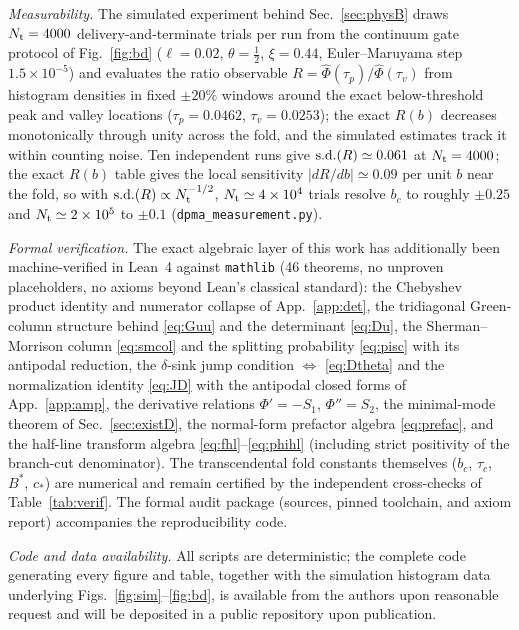 \documentclass[reprint,amsmath,amssymb,aps,prresearch,longbibliography]{revtex4-2}
\begin{document}
\emph{Measurability.} The simulated experiment behind Sec.~\ref{sec:physB} draws $N_{\rm t}=4000$
delivery-and-terminate trials per run from the continuum gate protocol of Fig.~\ref{fig:bd}
($\ell=0.02$, $\theta=\tfrac12$, $\xi=0.44$, Euler--Maruyama step $1.5\times10^{-5}$) and evaluates
the ratio observable $R=\hat\Phi(\tau_p)/\hat\Phi(\tau_v)$ from histogram densities in fixed
$\pm20\%$ windows around the exact below-threshold peak and valley locations ($\tau_p=0.0462$,
$\tau_v=0.0253$); the exact $R(b)$ decreases monotonically through unity across the fold, and the
simulated estimates track it within counting noise. Ten independent runs
give ${\rm s.d.}(R)\simeq0.061$ at $N_{\rm t}=4000$; the exact $R(b)$ table gives the local
sensitivity $|dR/db|\simeq0.09$ per unit $b$ near the fold, so with
${\rm s.d.}(R)\propto N_{\rm t}^{-1/2}$, $N_{\rm t}\simeq4\times10^4$ trials resolve $b_c$ to
roughly $\pm0.25$ and $N_{\rm t}\simeq2\times10^5$ to $\pm0.1$ (\texttt{dpma\_measurement.py}).

\emph{Formal verification.} The exact algebraic layer of this work has additionally been
machine-verified in Lean~4 against \texttt{mathlib} (46 theorems, no unproven placeholders, no
axioms beyond Lean's classical standard): the Chebyshev product identity and numerator collapse
of App.~\ref{app:det}, the tridiagonal Green-column structure behind \eqref{eq:Guu} and the
determinant \eqref{eq:Du}, the Sherman--Morrison column \eqref{eq:smcol} and the splitting
probability \eqref{eq:pisc} with its antipodal reduction, the $\delta$-sink jump condition
$\Leftrightarrow$ \eqref{eq:Dtheta} and the normalization identity \eqref{eq:JD} with the antipodal
closed forms of App.~\ref{app:amp}, the derivative relations $\Phi'=-S_1$, $\Phi''=S_2$, the
minimal-mode theorem of Sec.~\ref{sec:existD}, the normal-form prefactor algebra
\eqref{eq:prefac}, and the half-line transform algebra
\eqref{eq:fhl}--\eqref{eq:phihl} (including strict positivity of the branch-cut denominator).
The transcendental fold constants themselves ($b_c$, $\tau_c$, $B^*$, $c_*$) are numerical and
remain certified by the independent cross-checks of Table~\ref{tab:verif}. The formal audit
package (sources, pinned toolchain, and axiom report) accompanies the reproducibility code.

\emph{Code and data availability.} All scripts are deterministic; the complete code generating every
figure and table, together with the simulation histogram data underlying
Figs.~\ref{fig:sim}--\ref{fig:bd}, is available from the authors upon reasonable request and will be
deposited in a public repository upon publication.
\end{document}
